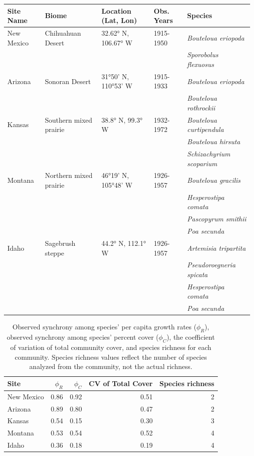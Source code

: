\documentclass[12pt,]{article}
\begin{document}
\begin{longtable}[c]{@{}lllll@{}}
\toprule
Site Name & Biome & Location (Lat, Lon) & Obs. Years &
Species\tabularnewline
\midrule
\endhead
New Mexico & Chihuahuan Desert & 32.62° N, 106.67° W & 1915-1950 &
\emph{Bouteloua eriopoda}\tabularnewline
& & & & \emph{Sporobolus flexuosus}\tabularnewline
Arizona & Sonoran Desert & 31°50' N, 110°53' W & 1915-1933 &
\emph{Bouteloua eriopoda}\tabularnewline
& & & & \emph{Bouteloua rothrockii}\tabularnewline
Kansas & Southern mixed prairie & 38.8° N, 99.3° W & 1932-1972 &
\emph{Bouteloua curtipendula}\tabularnewline
& & & & \emph{Bouteloua hirsuta}\tabularnewline
& & & & \emph{Schizachyrium scoparium}\tabularnewline
Montana & Northern mixed prairie & 46°19' N, 105°48' W & 1926-1957 &
\emph{Bouteloua gracilis}\tabularnewline
& & & & \emph{Hesperostipa comata}\tabularnewline
& & & & \emph{Pascopyrum smithii}\tabularnewline
& & & & \emph{Poa secunda}\tabularnewline
Idaho & Sagebrush steppe & 44.2° N, 112.1° W & 1926-1957 &
\emph{Artemisia tripartita}\tabularnewline
& & & & \emph{Pseudoroegneria spicata}\tabularnewline
& & & & \emph{Hesperostipa comata}\tabularnewline
& & & & \emph{Poa secunda}\tabularnewline
\bottomrule
\end{longtable}

\normalsize

\pagebreak{}

\begin{table}[ht]
\centering
\caption{Observed synchrony among species' per capita growth rates ($\phi_{R}$), observed synchrony among species' percent cover ($\phi_{C}$), the coefficient of variation of total community cover, and species richness for each community. Species richness values reflect the number of species analyzed from the community, not the actual richness.} 
{\normalsize
\begin{tabular}{lrrrr}
  \hline
Site & $\phi_{R}$ & $\phi_{C}$ & CV of Total Cover & Species richness \\ 
  \hline
New Mexico & 0.86 & 0.92 & 0.51 &   2 \\ 
  Arizona & 0.89 & 0.80 & 0.47 &   2 \\ 
  Kansas & 0.54 & 0.15 & 0.30 &   3 \\ 
  Montana & 0.53 & 0.54 & 0.52 &   4 \\ 
  Idaho & 0.36 & 0.18 & 0.19 &   4 \\ 
   \hline
\end{tabular}
}
\end{table}
\end{document}
